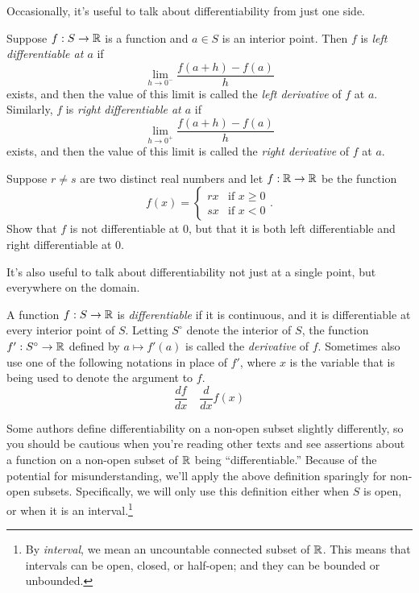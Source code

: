 Occasionally, it's useful to talk about differentiability from just one side. 

\begin{definition}
	Suppose $f : S \to \mathbb{R}$ is a function and $a \in S$ is an interior point. Then $f$ is \emph{left differentiable at $a$} if 
	\[ \lim_{h \to 0^-} \frac{f(a+h)-f(a)}{h} \]
	exists, and then the value of this limit is called the \emph{left derivative} of $f$ at $a$. Similarly, $f$ is \emph{right differentiable at $a$} if 
	\[ \lim_{h \to 0^+} \frac{f(a+h)-f(a)}{h} \]
	exists, and then the value of this limit is called the \emph{right derivative} of $f$ at $a$.
\end{definition}

\begin{exercise}
	Suppose $r \neq s$ are two distinct real numbers and let $f : \mathbb{R} \to \mathbb{R}$ be the function
	\[ f(x) = \begin{cases} rx & \text{if } x \geq 0 \\ sx & \text{if } x < 0 \end{cases}. \]
	Show that $f$ is not differentiable at $0$, but that it is both left differentiable and right differentiable at 0. 
\end{exercise}

It's also useful to talk about differentiability not just at a single point, but everywhere on the domain. 

\begin{definition}  
	A function $f : S \to \mathbb{R}$ is \emph{differentiable} if it is continuous, and it is differentiable at every interior point of $S$. Letting $S^\circ$ denote the interior of $S$, the function $f' : S^\circ \to \mathbb{R}$ defined by $a \mapsto f'(a)$ is called the \emph{derivative} of $f$. Sometimes also use one of the following notations in place of $f'$, where $x$ is the variable that is being used to denote the argument to $f$. \[ \frac{df}{dx} \quad \frac{d}{dx} f(x) \] 
\end{definition}

\begin{caution}
	Some authors define differentiability on a non-open subset slightly differently, so you should be cautious when you're reading other texts and see assertions about a function on a non-open subset of $\mathbb{R}$ being ``differentiable.'' Because of the potential for misunderstanding, we'll apply the above definition sparingly for non-open subsets. Specifically, we will only use this definition either when $S$ is open, or when it is an interval.\footnote{By \emph{interval}, we mean an uncountable connected subset of $\mathbb{R}$. This means that intervals can be open, closed, or half-open; and they can be bounded or unbounded.}
\end{caution}


